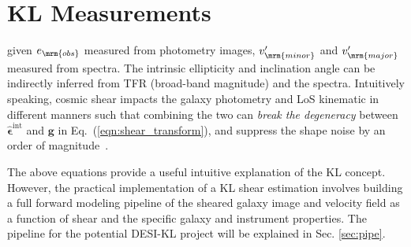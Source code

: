 \section{KL Measurements}
\label{sec:kl}


given $e_\mrm{obs}$ measured from photometry images, $v_\mrm{minor}^\prime$ and $v_\mrm{major}^\prime$ measured from spectra. The intrinsic ellipticity and inclination angle can be indirectly inferred from TFR (broad-band magnitude) and the spectra. Intuitively speaking, cosmic shear impacts the galaxy photometry and LoS kinematic in different manners such that combining the two can \textit{break the degeneracy} between $\hat{\bm{\epsilon}}^\mathrm{int}$ and $\bm{g}$ in Eq.~(\ref{eqn:shear_transform}), and suppress the shape noise by an order of magnitude~\citep{HKE+13,XEH+23,PKH+23}.

The above equations provide a useful intuitive explanation of the KL concept. However, the practical implementation of a KL shear estimation involves building a full forward modeling pipeline of the sheared galaxy image and velocity field as a function of shear and the specific galaxy and instrument properties. The pipeline for the potential DESI-KL project will be explained in Sec. \ref{sec:pipe}.